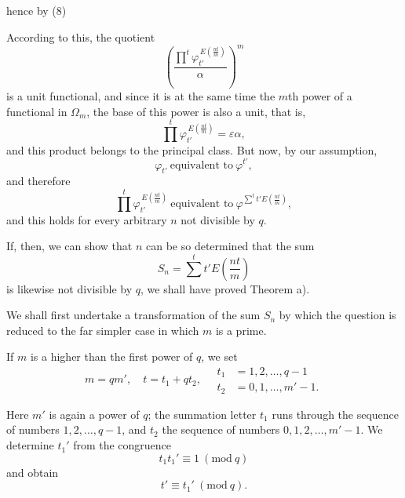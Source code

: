 hence by (8)

According to this, the quotient
\[
\left(\frac{\prod\limits^{t} \varphi_{t'}^{\,E\left(\frac{n t}{m}\right)}}{\alpha}\right)^m
\]
is a unit functional, and since it is at the same time the $m$th power of a
functional in $\Omega_m$, the base of this power is also a unit, that is,
\[
\prod^{t} \varphi_{t'}^{\,E\left(\frac{n t}{m}\right)} = \varepsilon \alpha,
\]
and this product belongs to the principal class. But now, by our
assumption,
\[
\varphi_{t'}\ \text{equivalent to}\ \varphi^{t'},
\]
and therefore
\[
\prod^{t} \varphi_{t'}^{\,E\left(\frac{n t}{m}\right)}\ \text{equivalent to}\ \varphi^{\sum^{t} t' E\left(\frac{n t}{m}\right)},
\]
and this holds for every arbitrary $n$ not divisible by $q$.

If, then, we can show that $n$ can be so determined that the sum
\[
S_n = \sum^{t} t' E\left(\frac{n t}{m}\right)
\]
is likewise not divisible by $q$, we shall have proved Theorem a).

We shall first undertake a transformation of the sum $S_n$ by which
the question is reduced to the far simpler case in which $m$ is a
prime.

If $m$ is a higher than the first power of $q$, we set
\[
m = q m', \quad t = t_1 + q t_2, \quad
\begin{aligned}
t_1 &= 1, 2, \dots, q-1 \\
t_2 &= 0, 1, \dots, m'-1.
\end{aligned}
\]

Here $m'$ is again a power of $q$; the summation letter $t_1$ runs
through the sequence of numbers $1, 2, \dots, q-1$, and $t_2$ the
sequence of numbers $0, 1, 2, \dots, m'-1$. We determine $t_1'$ from the
congruence
\[
t_1 t_1' \equiv 1\ (\mathrm{mod}\ q)
\]
and obtain
\[
t' \equiv t_1'\ (\mathrm{mod}\ q).
\]
